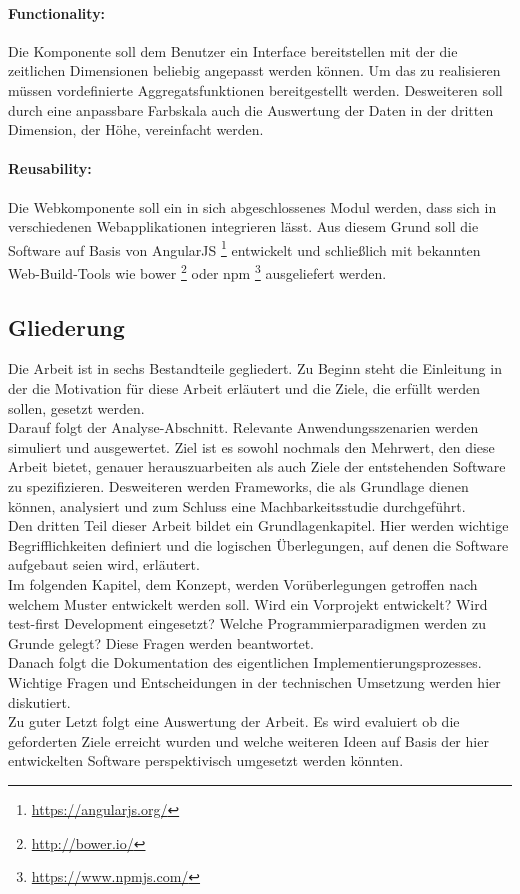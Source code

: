 \documentclass[12pt]{article}
\begin{document}
		\paragraph{Functionality:}
		Die Komponente soll dem Benutzer ein Interface bereitstellen mit der
		die zeitlichen Dimensionen beliebig angepasst werden können. Um das zu realisieren 
		müssen vordefinierte Aggregatsfunktionen bereitgestellt werden. Desweiteren
		soll durch eine anpassbare Farbskala auch die Auswertung der Daten in der
		dritten Dimension, der Höhe, vereinfacht werden.
		\paragraph{Reusability:}
		Die Webkomponente soll ein in sich abgeschlossenes Modul werden, dass sich
		in verschiedenen Webapplikationen integrieren lässt. Aus diesem
		Grund soll die Software auf Basis von AngularJS
		\footnote{\url{https://angularjs.org/}} entwickelt und schließlich mit bekannten 
		Web-Build-Tools wie bower \footnote{\url{http://bower.io/}} oder npm
		\footnote{\url{https://www.npmjs.com/}} ausgeliefert werden.
		
	\newpage	
		
	\subsection{Gliederung}
		Die Arbeit ist in sechs Bestandteile gegliedert. Zu Beginn steht die
		Einleitung in der die Motivation für diese Arbeit erläutert und die Ziele, die erfüllt
		werden sollen, gesetzt werden.\\[0.4cm]
		Darauf folgt der Analyse-Abschnitt. Relevante Anwendungsszenarien
		werden simuliert und ausgewertet. Ziel ist es sowohl nochmals den Mehrwert,
		den diese Arbeit bietet, genauer herauszuarbeiten als auch Ziele der
		entstehenden Software zu spezifizieren. Desweiteren werden Frameworks, die als Grundlage
		dienen können, analysiert und zum Schluss eine Machbarkeitsstudie
		durchgeführt.\\[0.4cm]
		Den dritten Teil dieser Arbeit bildet ein Grundlagenkapitel. Hier werden
		wichtige Begrifflichkeiten definiert und die logischen Überlegungen, auf denen
		die Software aufgebaut seien wird, erläutert.\\[0.4cm]
		Im folgenden Kapitel, dem Konzept, werden Vorüberlegungen getroffen nach
		welchem Muster entwickelt werden soll. Wird ein Vorprojekt entwickelt? Wird
		test-first Development eingesetzt? Welche Programmierparadigmen werden zu
		Grunde gelegt? Diese Fragen werden beantwortet.\\[0.4cm]
		Danach folgt die Dokumentation des eigentlichen Implementierungsprozesses.
		Wichtige Fragen und Entscheidungen in der technischen Umsetzung werden hier
		diskutiert.\\[0.4cm]
		Zu guter Letzt folgt eine Auswertung der Arbeit. Es wird evaluiert ob die
		geforderten Ziele erreicht wurden und welche weiteren Ideen auf Basis der hier
		entwickelten Software perspektivisch umgesetzt werden könnten.
		
\end{document}

